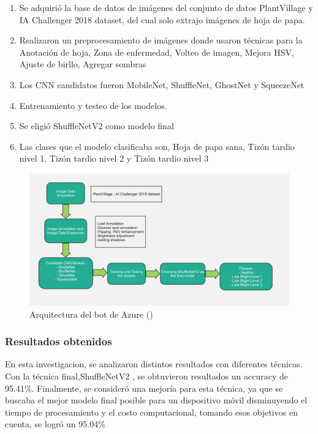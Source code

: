 \begin{enumerate}
 	\item Se adquirió la base de datos de imágenes del conjunto de datos PlantVillage y IA Challenger 2018 dataset, del cual solo extrajo imágenes de hoja de papa.
 	\item Realizaron un preprocesamiento de imágenes donde usaron técnicas para la Anotación de hoja, Zona de enfermedad, Volteo de imagen, Mejora HSV, Ajuste de birllo, Agregar sombras
 	\item Los CNN candidatos fueron  MobileNet, ShuffleNet, GhostNet y SqueezeNet
 	\item Entrenamiento y testeo de los modelos.
 	\item Se eligió ShuffleNetV2 como modelo final
 	\item Las clases que el modelo clasificaba son, Hoja de papa sana, Tizón tardio nivel 1, Tizón tardio nivel 2 y Tizón tardio nivel 3
 \end{enumerate}
\begin{figure}[H]
	\begin{center}
		\includegraphics[width=1\textwidth]{2/figures/ant2.2.jpg}
		\caption{Arquitectura del bot de Azure (\cite{antecedente2})}
	\end{center}
\end{figure}


\subsubsection{Resultados obtenidos}
En esta investigacion, se analizaron distintos resultados con diferentes técnicas. Con la técnica final,ShuffleNetV2 , se obtuvieron resultados un accuracy de 95.41\%. Finalmente, se consideró una mejoría para esta técnica, ya que se buscaba el mejor modelo final posible para un dispositivo móvil disminuyendo el tiempo de procesamiento y el costo computacional, tomando esos objetivos en cuenta, se logró un 95.04\%

